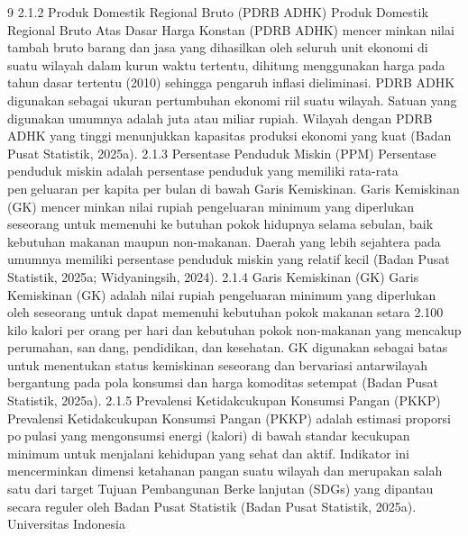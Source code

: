 9
2.1.2 Produk Domestik Regional Bruto (PDRB ADHK)
Produk Domestik Regional Bruto Atas Dasar Harga Konstan (PDRB ADHK) mencerminkan nilai tambah bruto barang dan jasa yang dihasilkan oleh seluruh unit ekonomi di
suatu wilayah dalam kurun waktu tertentu, dihitung menggunakan harga pada tahun dasar
tertentu (2010) sehingga pengaruh inflasi dieliminasi. PDRB ADHK digunakan sebagai
ukuran pertumbuhan ekonomi riil suatu wilayah. Satuan yang digunakan umumnya adalah
juta atau miliar rupiah. Wilayah dengan PDRB ADHK yang tinggi menunjukkan kapasitas
produksi ekonomi yang kuat (Badan Pusat Statistik, 2025a).
2.1.3 Persentase Penduduk Miskin (PPM)
Persentase penduduk miskin adalah persentase penduduk yang memiliki rata-rata pengeluaran per kapita per bulan di bawah Garis Kemiskinan. Garis Kemiskinan (GK) mencerminkan nilai rupiah pengeluaran minimum yang diperlukan seseorang untuk memenuhi kebutuhan pokok hidupnya selama sebulan, baik kebutuhan makanan maupun non-makanan.
Daerah yang lebih sejahtera pada umumnya memiliki persentase penduduk miskin yang
relatif kecil (Badan Pusat Statistik, 2025a; Widyaningsih, 2024).
2.1.4 Garis Kemiskinan (GK)
Garis Kemiskinan (GK) adalah nilai rupiah pengeluaran minimum yang diperlukan
oleh seseorang untuk dapat memenuhi kebutuhan pokok makanan setara 2.100 kilo kalori
per orang per hari dan kebutuhan pokok non-makanan yang mencakup perumahan, sandang, pendidikan, dan kesehatan. GK digunakan sebagai batas untuk menentukan status
kemiskinan seseorang dan bervariasi antarwilayah bergantung pada pola konsumsi dan
harga komoditas setempat (Badan Pusat Statistik, 2025a).
2.1.5 Prevalensi Ketidakcukupan Konsumsi Pangan (PKKP)
Prevalensi Ketidakcukupan Konsumsi Pangan (PKKP) adalah estimasi proporsi populasi yang mengonsumsi energi (kalori) di bawah standar kecukupan minimum untuk
menjalani kehidupan yang sehat dan aktif. Indikator ini mencerminkan dimensi ketahanan
pangan suatu wilayah dan merupakan salah satu dari target Tujuan Pembangunan Berkelanjutan (SDGs) yang dipantau secara reguler oleh Badan Pusat Statistik (Badan Pusat
Statistik, 2025a).
Universitas Indonesia

